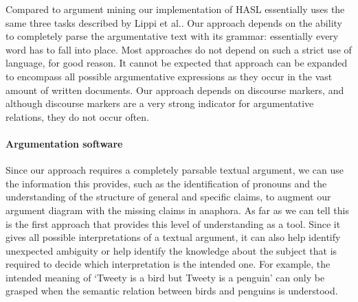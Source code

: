 Compared to argument mining our implementation of HASL essentially uses the same three tasks described by Lippi et al.\cite{lippi2016argumentation}. Our approach depends on the ability to completely parse the argumentative text with its grammar: essentially every word has to fall into place. Most approaches do not depend on such a strict use of language, for good reason. It cannot be expected that approach can be expanded to encompass all possible argumentative expressions as they occur in the vast amount of written documents. Our approach depends on discourse markers, and although discourse markers are a very strong indicator for argumentative relations, they do not occur often\cite{lawrenceReed2015}.

\paragraph{Argumentation software}
Since our approach requires a completely parsable textual argument, we can use the information this provides, such as the identification of pronouns and the understanding of the structure of general and specific claims, to augment our argument diagram with the missing claims in anaphora. As far as we can tell this is the first approach that provides this level of understanding as a tool. Since it gives all possible interpretations of a textual argument, it can also help identify unexpected ambiguity or help identify the knowledge about the subject that is required to decide which interpretation is the intended one. For example, the intended meaning of `Tweety is a bird but Tweety is a penguin' can only be grasped when the semantic relation between birds and penguins is understood.
